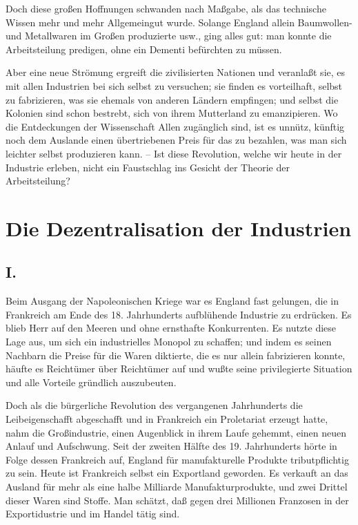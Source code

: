 \documentclass{scrbook}
\begin{document}
Doch diese großen Hoffnungen schwanden nach Maßgabe, als das technische Wissen mehr und mehr Allgemeingut wurde. Solange England allein Baumwollen- und Metallwaren im Großen produzierte usw., ging alles gut: man konnte die Arbeitsteilung predigen, ohne ein Dementi befürchten zu müssen.

Aber eine neue Strömung ergreift die zivilisierten Nationen und veranlaßt sie, es mit allen Industrien bei sich selbst zu versuchen; sie finden es vorteilhaft, selbst zu fabrizieren, was sie ehemals von anderen Ländern empfingen; und selbst die Kolonien sind schon bestrebt, sich von ihrem Mutterland zu emanzipieren. Wo die Entdeckungen der Wissenschaft Allen zugänglich sind, ist es unnütz, künftig noch dem Auslande einen übertriebenen Preis für das zu bezahlen, was man sich leichter selbst produzieren kann. – Ist diese Revolution, welche wir heute in der Industrie erleben, nicht ein Faustschlag ins Gesicht der Theorie der Arbeitsteilung?

\chapter{Die Dezentralisation der Industrien}
\section*{I.}

Beim Ausgang der Napoleonischen Kriege war es England fast gelungen, die in Frankreich am Ende des 18. Jahrhunderts aufblühende Industrie zu erdrücken. Es blieb Herr auf den Meeren und ohne ernsthafte Konkurrenten. Es nutzte diese Lage aus, um sich ein industrielles Monopol zu schaffen; und indem es seinen Nachbarn die Preise für die Waren diktierte, die es nur allein fabrizieren konnte, häufte es Reichtümer über Reichtümer auf und wußte seine privilegierte Situation und alle Vorteile gründlich auszubeuten.

Doch als die bürgerliche Revolution des vergangenen Jahrhunderts die Leibeigenschafft abgeschafft und in Frankreich ein Proletariat erzeugt hatte, nahm die Großindustrie, einen Augenblick in ihrem Laufe gehemmt, einen neuen Anlauf und Aufschwung. Seit der zweiten Hälfte des 19. Jahrhunderts hörte in Folge dessen Frankreich auf, England für manufakturelle Produkte tributpflichtig zu sein. Heute ist Frankreich selbst ein Exportland geworden. Es verkauft an das Ausland für mehr als eine halbe Milliarde Manufakturprodukte, und zwei Drittel dieser Waren sind Stoffe. Man schätzt, daß gegen drei Millionen Franzosen in der Exportidustrie und im Handel tätig sind.
\end{document}
